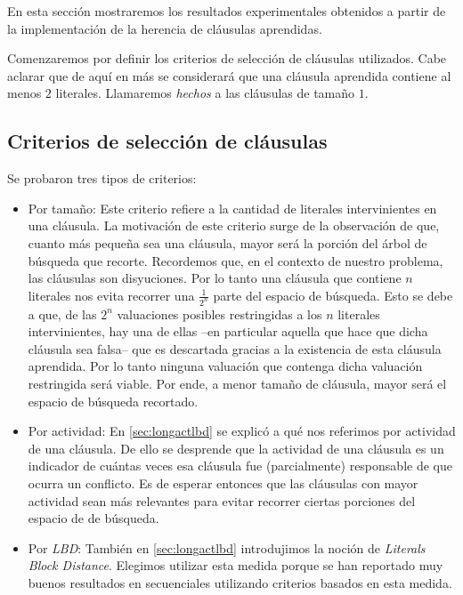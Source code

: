 En esta sección mostraremos los resultados experimentales obtenidos a partir
de la implementación de la herencia de cláusulas aprendidas.

Comenzaremos por definir los criterios de selección de cláusulas utilizados.
Cabe aclarar que de aquí en más se considerará que una cláusula aprendida
contiene al menos $2$ literales. Llamaremos \emph{hechos} a las cláusulas de
tamaño $1$.

\subsection{Criterios de selección de cláusulas}

Se probaron tres tipos de criterios:

\begin{itemize}
	\item Por tamaño: Este criterio refiere a la cantidad de literales intervinientes en una cláusula. La motivación de este criterio surge de la observación de que, cuanto más pequeña sea una cláusula, mayor será la porción del árbol de búsqueda que recorte. Recordemos que, en el contexto de nuestro problema, las cláusulas son disyuciones. Por lo tanto una cláusula que contiene $n$ literales nos evita recorrer una $\frac{1}{2^n}$ parte del espacio de búsqueda. Esto se debe a que, de las $2^n$ valuaciones posibles restringidas a los $n$ literales intervinientes, hay una de ellas --en particular aquella que hace que dicha cláusula sea falsa-- que es descartada gracias a la existencia de esta cláusula aprendida. Por lo tanto ninguna valuación que contenga dicha valuación restringida será viable. Por ende, a menor tamaño de cláusula, mayor será el espacio de búsqueda recortado.

	\item Por actividad: En \ref{sec:longactlbd} se explicó a qué nos referimos por actividad de una cláusula. De ello se desprende que la actividad de una cláusula es un indicador de cuántas veces esa cláusula fue (parcialmente) responsable de que ocurra un conflicto. Es de esperar entonces que las cláusulas con mayor actividad sean más relevantes para evitar recorrer ciertas porciones del espacio de de búsqueda.

	\item Por \emph{LBD}: También en \ref{sec:longactlbd} introdujimos la noción de \emph{Literals Block Distance}. Elegimos utilizar esta medida porque se han reportado muy buenos resultados en \ssolvers secuenciales utilizando criterios basados en esta medida.
\end{itemize}

